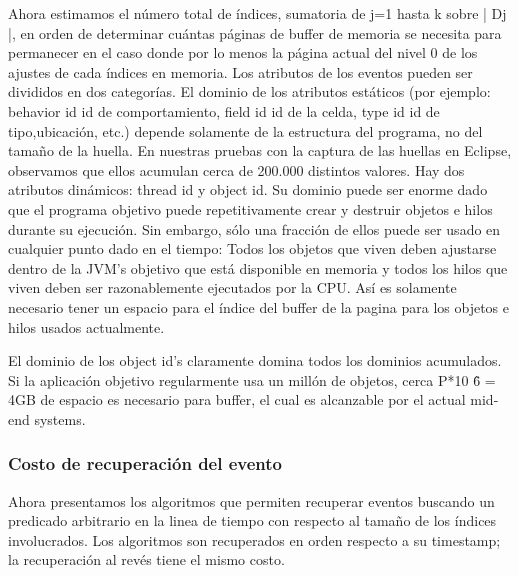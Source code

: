 \documentclass[12pt,legalpaper]{report}
\begin{document}
	Ahora estimamos el número total de índices, sumatoria de j=1 hasta k sobre | Dj |, en orden de determinar cuántas páginas de buffer de memoria se necesita para permanecer en el caso donde por lo menos la página actual del nivel 0 de los ajustes de cada índices en memoria.  Los atributos de los eventos pueden ser divididos en dos categorías.  El dominio de los atributos estáticos (por ejemplo: behavior id {id de comportamiento}, field id {id de la celda}, type id {id de tipo},ubicación, etc.) depende solamente de la estructura del programa, no del tamaño de la huella.  En nuestras pruebas con la captura de las huellas en Eclipse, observamos que ellos acumulan cerca de 200.000 distintos valores.  Hay dos atributos dinámicos: thread id y object id.  Su dominio puede ser enorme dado que el programa objetivo puede repetitivamente crear y destruir objetos e hilos durante su ejecución.  Sin embargo, sólo una fracción de ellos puede ser usado en cualquier punto dado en el tiempo:  Todos los objetos que viven deben ajustarse dentro de la JVM's objetivo que está disponible en memoria y todos los hilos que viven deben ser razonablemente ejecutados por la CPU.  Así es solamente necesario tener un espacio para el índice del buffer de la pagina para los objetos e hilos usados actualmente.

	El dominio de los  object id's claramente domina todos los dominios acumulados.  Si la aplicación objetivo regularmente usa un millón de objetos, cerca P*10 \^ 6 = 4GB de espacio es necesario para buffer, el cual es alcanzable por el actual mid-end systems.


			\subsubsection{Costo de recuperación del evento}

	Ahora presentamos los algoritmos que permiten recuperar eventos buscando un predicado arbitrario en la linea de tiempo con respecto al tamaño de los índices involucrados.  Los algoritmos son recuperados en orden respecto a su timestamp; la recuperación al revés tiene el mismo costo.
\end{document}

